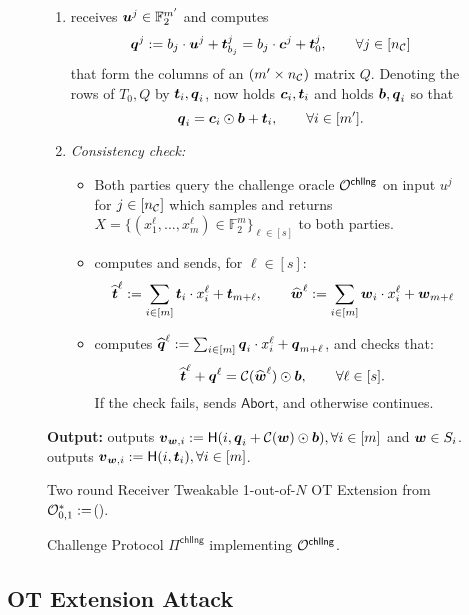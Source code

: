 \begin{figure}[t]
{\begin{minipage}{0.95\linewidth}
\begin{enumerate}
				\item \send receives $\boldsymbol{u}^j\in\mathbb{F}^{m'}_2$ and computes
				$$
					\boldsymbol{q}^j := b_j \cdot \boldsymbol{u}^j +\boldsymbol{t}^j_{b_j} = b_j\cdot \boldsymbol{c}^j+\boldsymbol{t}^j_0,\qquad \forall j\in[{n_\mathcal{C}}]
				$$
				that form the columns of an $(m'\times {n_\mathcal{C}})$ matrix $Q$. Denoting the rows of $T_0, Q$ by $\boldsymbol{t}_i,\boldsymbol{q}_i$, \rec now holds $\boldsymbol{c}_i,\boldsymbol{t}_i$ and \send holds $\boldsymbol{b}, \boldsymbol{q}_i$ so that 
				$$
					\boldsymbol{q}_i = \boldsymbol{c}_i\odot \boldsymbol{b}+\boldsymbol{t}_i,\qquad \forall i\in[m'].
				$$
				
				\item \emph{Consistency check:}
				\begin{itemize}
					\item Both parties query the challenge oracle $\mathcal{O}^{\textsf{chllng}}$ on input $u^j$ for $j\in[{n_\mathcal{C}}]$  which samples and returns $X=\{(x_1^{\ell}, ...,x_m^{\ell} )\in \mathbb{F}^m_2\}_{\ell\in[s]}$ %
					to both parties.
					
					\item \rec computes and sends, for $\ell \in[s]$:
					$$
						\widehat {\boldsymbol{t}}^{\ell} := \sum_{i\in[m]} \boldsymbol{t}_i \cdot x_i^\ell + \boldsymbol{t}_{m+\ell}, \qquad \widehat {\boldsymbol{w}}^\ell := \sum_{i\in[m]} \boldsymbol{w}_i \cdot x_i^\ell + \boldsymbol{w}_{m+\ell}
					$$
					
					\item \send computes $\widehat {\boldsymbol{q}}^\ell := \sum_{i\in[m]} \boldsymbol{q}_i \cdot x^\ell_i + \boldsymbol{q}_{m+\ell}$, and checks that:
					$$
						\widehat{\boldsymbol{t}}^\ell + \boldsymbol{q}^\ell = \mathcal{C}(\widehat{\boldsymbol{w}}^\ell) \odot \boldsymbol{b}, \qquad \forall\ell\in[s].
					$$
					If the check fails, \send sends $\textsf{Abort}$, and otherwise continues.
				\end{itemize}
			\end{enumerate}
		
		\textbf{Output:} \send outputs $\boldsymbol{v}_{\boldsymbol{w},i}:=\mathsf{H}(i,\boldsymbol{q}_i+\mathcal{C}(\boldsymbol{w})\odot \boldsymbol{b}), \forall i\in[m]$ and $\boldsymbol{w}\in S_i$. \rec outputs $\boldsymbol{v}_{\boldsymbol{w},i}:= \mathsf{H}(i,\boldsymbol{t}_i), \forall i\in[m]$.
	\end{minipage}}
	\caption{ Two round Receiver Tweakable 1-out-of-$N$ OT Extension from $\mathcal{O}^*_{0,1}:=$().}
	\label{fig:otExt}
\end{figure}


\begin{figure}[t]
	\caption{ Challenge Protocol $\Pi^\textsf{chllng}$ implementing $\mathcal{O}^\textsf{chllng}$.}
	\label{fig:OChallenge}
\end{figure}

\subsection{OT Extension Attack}


